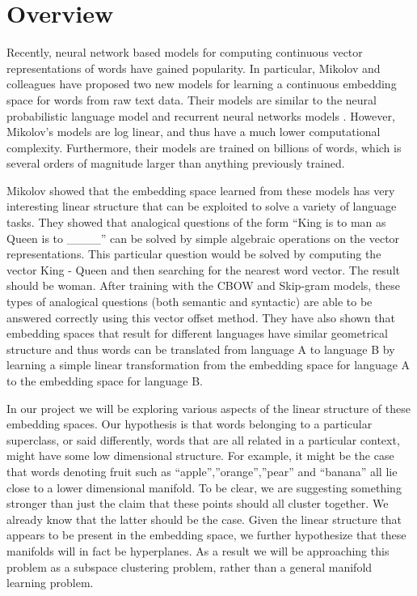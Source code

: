\section{Overview}\label{sec:overview}

Recently, neural network based models for computing continuous vector representations of words have gained popularity. 
In particular, Mikolov and colleagues \cite{mikolov1, mikolov2} have proposed two new models for learning a continuous embedding space for words from raw text data. 
Their models are similar to the neural probabilistic language model \cite{bengio} and recurrent neural networks models \cite{mikolov5}. 
However, Mikolov’s models are log linear, and thus have a much lower computational complexity. 
Furthermore, their models are trained on billions of words, which is several orders of magnitude larger than anything previously trained.
 
Mikolov \etal \cite{mikolov3} showed that the embedding space learned from these models has very interesting linear structure that can be exploited to solve a variety of language tasks. 
They showed that analogical questions of the form “King is to man as Queen is to \_\_\_\_” can be solved by simple algebraic operations on the vector representations. 
This particular question would be solved by computing the vector King -  Queen and then searching for the nearest word vector. 
The result should be woman. 
After training with the CBOW and Skip-gram models, these types of analogical questions (both semantic and syntactic) are able to be answered correctly using this vector offset method. 
They have also shown that embedding spaces that result for different languages have similar geometrical structure and thus words can be translated from language A to language B by learning a simple linear transformation from the embedding space for language A to the embedding space for language B.
 
In our project we will be exploring various aspects of the linear structure of these embedding spaces. 
Our hypothesis is that words belonging to a particular superclass, or said differently, words that are all related in a particular context, might have some low dimensional structure. 
For example, it might be the case that words denoting fruit such as “apple”,”orange”,”pear” and “banana” all lie close to a lower dimensional manifold. 
To be clear, we are suggesting something stronger than just the claim that these points should all cluster together. 
We already know that the latter should be the case. 
Given the linear structure that appears to be present in the embedding space, we further hypothesize that these manifolds will in fact be hyperplanes. 
As a result we will be approaching this problem as a subspace clustering problem, rather than a general manifold learning problem.
